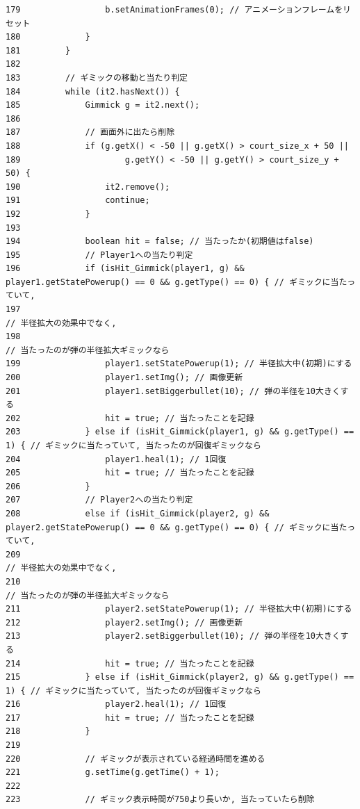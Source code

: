 \documentclass[11pt,a4j]{jarticle}
\begin{document}
\begin{small}
\begin{verbatim}
179                 b.setAnimationFrames(0); // アニメーションフレームをリセット
180             }
181         }
182 
183         // ギミックの移動と当たり判定
184         while (it2.hasNext()) {
185             Gimmick g = it2.next();
186 
187             // 画面外に出たら削除
188             if (g.getX() < -50 || g.getX() > court_size_x + 50 ||
189                     g.getY() < -50 || g.getY() > court_size_y + 50) {
190                 it2.remove();
191                 continue;
192             }
193 
194             boolean hit = false; // 当たったか(初期値はfalse)
195             // Player1への当たり判定
196             if (isHit_Gimmick(player1, g) && player1.getStatePowerup() == 0 && g.getType() == 0) { // ギミックに当たっていて,
197                                                                                                    // 半径拡大の効果中でなく,
198                                                                                                    // 当たったのが弾の半径拡大ギミックなら
199                 player1.setStatePowerup(1); // 半径拡大中(初期)にする
200                 player1.setImg(); // 画像更新
201                 player1.setBiggerbullet(10); // 弾の半径を10大きくする
202                 hit = true; // 当たったことを記録
203             } else if (isHit_Gimmick(player1, g) && g.getType() == 1) { // ギミックに当たっていて, 当たったのが回復ギミックなら
204                 player1.heal(1); // 1回復
205                 hit = true; // 当たったことを記録
206             }
207             // Player2への当たり判定
208             else if (isHit_Gimmick(player2, g) && player2.getStatePowerup() == 0 && g.getType() == 0) { // ギミックに当たっていて,
209                                                                                                         // 半径拡大の効果中でなく,
210                                                                                                         // 当たったのが弾の半径拡大ギミックなら
211                 player2.setStatePowerup(1); // 半径拡大中(初期)にする
212                 player2.setImg(); // 画像更新
213                 player2.setBiggerbullet(10); // 弾の半径を10大きくする
214                 hit = true; // 当たったことを記録
215             } else if (isHit_Gimmick(player2, g) && g.getType() == 1) { // ギミックに当たっていて, 当たったのが回復ギミックなら
216                 player2.heal(1); // 1回復
217                 hit = true; // 当たったことを記録
218             }
219 
220             // ギミックが表示されている経過時間を進める
221             g.setTime(g.getTime() + 1);
222 
223             // ギミック表示時間が750より長いか, 当たっていたら削除

\end{verbatim}
\end{small}
\end{document}
